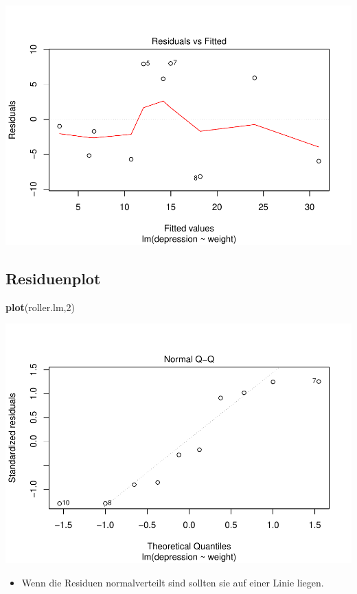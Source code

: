 \documentclass[]{article}
\newenvironment{Shaded}{\begin{snugshade}}{\end{snugshade}}
\newcommand{\KeywordTok}[1]{\textcolor[rgb]{0.13,0.29,0.53}{\textbf{{#1}}}}
\newcommand{\DecValTok}[1]{\textcolor[rgb]{0.00,0.00,0.81}{{#1}}}
\newcommand{\NormalTok}[1]{{#1}}
\providecommand{\tightlist}{%
  \setlength{\itemsep}{0pt}\setlength{\parskip}{0pt}}
\begin{document}
\includegraphics{Intro_Datenanalyse1_files/figure-latex/unnamed-chunk-193-1.pdf}

\subsection{Residuenplot}\label{residuenplot-1}

\begin{Shaded}
\begin{Highlighting}[]
\KeywordTok{plot}\NormalTok{(roller.lm,}\DecValTok{2}\NormalTok{)}
\end{Highlighting}
\end{Shaded}

\includegraphics{Intro_Datenanalyse1_files/figure-latex/unnamed-chunk-194-1.pdf}

\begin{itemize}
\tightlist
\item
  Wenn die Residuen normalverteilt sind sollten sie auf einer Linie
  liegen.
\end{itemize}
\end{document}
